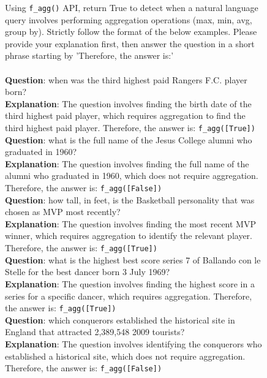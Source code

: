 \begin{figure}[htb]

\begin{tcolorbox}
[title = Aggregation Query Classification, colback = gray!10, colframe = black, sharp corners, boxrule=0.5mm]

Using \texttt{f\_agg()} API, return True to detect when a natural language query involves performing aggregation operations (max, min, avg, group by). 
Strictly follow the format of the below examples. Please provide your explanation first, then answer the question in a short phrase starting by ’Therefore, the answer is:’ \\
 \\
\textbf{Question}: when was the third highest paid Rangers F.C. player born? \\
\textbf{Explanation}: The question involves finding the birth date of the third highest paid player, which requires aggregation to find the third highest paid player. Therefore, the answer is: \texttt{f\_agg([True])} \\

\textbf{Question}: what is the full name of the Jesus College alumni who graduated in 1960? \\
\textbf{Explanation}: The question involves finding the full name of the alumni who graduated in 1960, which does not require aggregation. Therefore, the answer is: \texttt{f\_agg([False])} \\

\textbf{Question}: how tall, in feet, is the Basketball personality that was chosen as MVP most recently? \\
\textbf{Explanation}: The question involves finding the most recent MVP winner, which requires aggregation to identify the relevant player. Therefore, the answer is: \texttt{f\_agg([True])} \\

\textbf{Question}: what is the highest best score series 7 of Ballando con le Stelle for the best dancer born 3 July 1969? \\
\textbf{Explanation}: The question involves finding the highest score in a series for a specific dancer, which requires aggregation. Therefore, the answer is: \texttt{f\_agg([True])} \\

\textbf{Question}: which conquerors established the historical site in England that attracted 2,389,548 2009 tourists? \\
\textbf{Explanation}: The question involves identifying the conquerors who established a historical site, which does not require aggregation. Therefore, the answer is: \texttt{f\_agg([False])} \\


\end{tcolorbox}
\end{figure}
